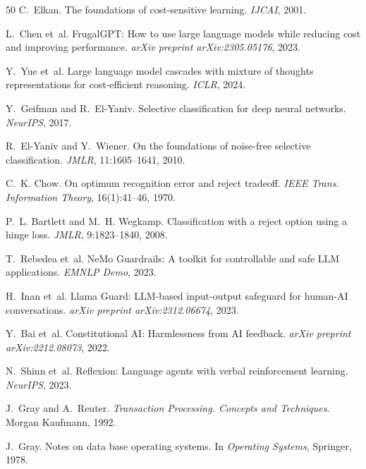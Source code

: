 \begin{thebibliography}{50}
C.~Elkan.
\newblock The foundations of cost-sensitive learning.
\newblock \emph{IJCAI}, 2001.

L.~Chen et~al.
\newblock FrugalGPT: How to use large language models while reducing cost and improving performance.
\newblock \emph{arXiv preprint arXiv:2305.05176}, 2023.

Y.~Yue et~al.
\newblock Large language model cascades with mixture of thoughts representations for cost-efficient reasoning.
\newblock \emph{ICLR}, 2024.

Y.~Geifman and R.~El-Yaniv.
\newblock Selective classification for deep neural networks.
\newblock \emph{NeurIPS}, 2017.

R.~El-Yaniv and Y.~Wiener.
\newblock On the foundations of noise-free selective classification.
\newblock \emph{JMLR}, 11:1605--1641, 2010.

C.~K. Chow.
\newblock On optimum recognition error and reject tradeoff.
\newblock \emph{IEEE Trans. Information Theory}, 16(1):41--46, 1970.

P.~L. Bartlett and M.~H. Wegkamp.
\newblock Classification with a reject option using a hinge loss.
\newblock \emph{JMLR}, 9:1823--1840, 2008.

T.~Rebedea et~al.
\newblock NeMo Guardrails: A toolkit for controllable and safe LLM applications.
\newblock \emph{EMNLP Demo}, 2023.

H.~Inan et~al.
\newblock Llama Guard: LLM-based input-output safeguard for human-AI conversations.
\newblock \emph{arXiv preprint arXiv:2312.06674}, 2023.

Y.~Bai et~al.
\newblock Constitutional AI: Harmlessness from AI feedback.
\newblock \emph{arXiv preprint arXiv:2212.08073}, 2022.

N.~Shinn et~al.
\newblock Reflexion: Language agents with verbal reinforcement learning.
\newblock \emph{NeurIPS}, 2023.

J.~Gray and A.~Reuter.
\newblock \emph{Transaction Processing. Concepts and Techniques}.
\newblock Morgan Kaufmann, 1992.

J.~Gray.
\newblock Notes on data base operating systems.
\newblock In \emph{Operating Systems}, Springer, 1978.


\end{thebibliography}
